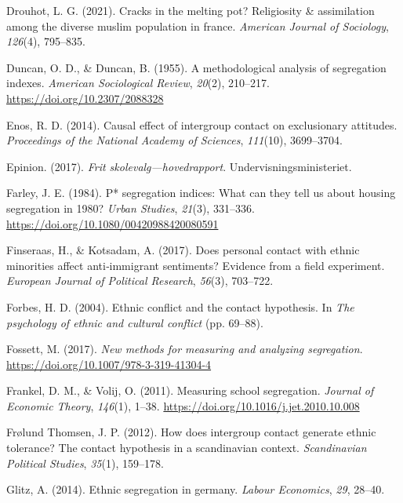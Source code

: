 \documentclass[
]{book}
\newlength{\cslhangindent}
\newenvironment{CSLReferences}[2] %
 {\begin{list}{}{%
  \setlength{\itemindent}{0pt}
  \setlength{\leftmargin}{0pt}
  \setlength{\parsep}{0pt}
  \ifodd #1
   \setlength{\leftmargin}{\cslhangindent}
   \setlength{\itemindent}{-1\cslhangindent}
  \fi
  \setlength{\itemsep}{#2\baselineskip}}}
 {\end{list}}
\begin{document}
\begin{CSLReferences}{1}{0}
Drouhot, L. G. (2021). Cracks in the melting pot? Religiosity \& assimilation among the diverse muslim population in france. \emph{American Journal of Sociology}, \emph{126}(4), 795--835.

Duncan, O. D., \& Duncan, B. (1955). A methodological analysis of segregation indexes. \emph{American Sociological Review}, \emph{20}(2), 210--217. \url{https://doi.org/10.2307/2088328}

Enos, R. D. (2014). Causal effect of intergroup contact on exclusionary attitudes. \emph{Proceedings of the National Academy of Sciences}, \emph{111}(10), 3699--3704.

Epinion. (2017). \emph{Frit skolevalg---hovedrapport}. Undervisningsministeriet.

Farley, J. E. (1984). P* segregation indices: What can they tell us about housing segregation in 1980? \emph{Urban Studies}, \emph{21}(3), 331--336. \url{https://doi.org/10.1080/00420988420080591}

Finseraas, H., \& Kotsadam, A. (2017). Does personal contact with ethnic minorities affect anti‐immigrant sentiments? Evidence from a field experiment. \emph{European Journal of Political Research}, \emph{56}(3), 703--722.

Forbes, H. D. (2004). Ethnic conflict and the contact hypothesis. In \emph{The psychology of ethnic and cultural conflict} (pp. 69--88).

Fossett, M. (2017). \emph{New methods for measuring and analyzing segregation}. \url{https://doi.org/10.1007/978-3-319-41304-4}

Frankel, D. M., \& Volij, O. (2011). Measuring school segregation. \emph{Journal of Economic Theory}, \emph{146}(1), 1--38. \url{https://doi.org/10.1016/j.jet.2010.10.008}

Frølund Thomsen, J. P. (2012). How does intergroup contact generate ethnic tolerance? The contact hypothesis in a scandinavian context. \emph{Scandinavian Political Studies}, \emph{35}(1), 159--178.

Glitz, A. (2014). Ethnic segregation in germany. \emph{Labour Economics}, \emph{29}, 28--40.


\end{CSLReferences}
\end{document}
